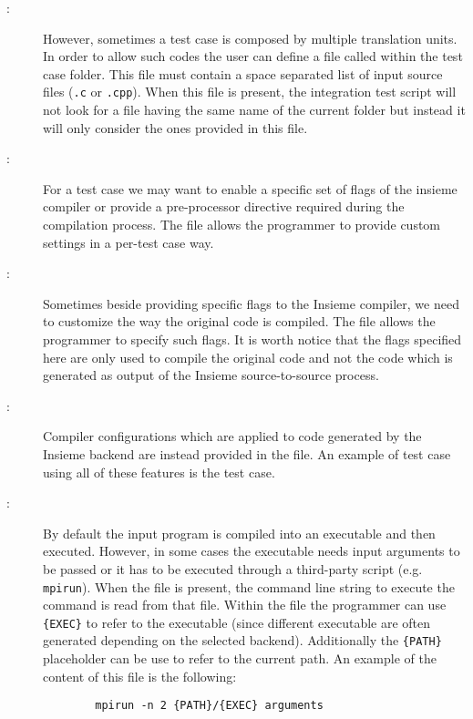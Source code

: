 \begin{description}

	\item[:]
		However, sometimes a test case is composed by multiple translation units. In
		order to allow such codes the user can define a file called 
		within the test case folder. This file must contain a space separated list of
		input source files ({\tt .c} or {\tt .cpp}). When this file is present, the
		integration test script will not look for a file having the same name of the
		current folder but instead it will only consider the ones provided in this file. 

	\item[:] For a test case we may want to enable a specific
		set of flags of the insieme compiler or provide a pre-processor directive
		required during the compilation process. The file 
		allows the programmer to provide custom settings in a per-test case way. 

	\item[:] Sometimes beside providing specific flags to the
		Insieme compiler, we need to customize the way the original code is
		compiled. The file  allows the programmer to specify
		such flags. It is worth notice that the flags specified here are only used
		to compile the original code and not the code which is generated as output
		of the Insieme source-to-source process. 

	\item[:] Compiler configurations which are applied
		to code generated by the Insieme backend are instead provided in the
		 file. An example of test case using all of these
		features is the  test case. 

	\item[:] By default the input program is compiled into an
		executable and then executed. However, in some cases the executable needs
		input arguments to be passed or it has to be executed through a
		third-party script (e.g. {\tt mpirun}). When the file  is
		present, the command line string to execute the command is read from that
		file. Within the file the programmer can use {\tt \{EXEC\}} to refer to
		the executable (since different executable are often generated depending
		on the selected backend). Additionally the {\tt \{PATH\}} placeholder can
		be use to refer to the current path. An example of the content of this
		file is the following: 
		\begin{verbatim} 
		mpirun -n 2 {PATH}/{EXEC} arguments
		\end{verbatim} 

\end{description}

